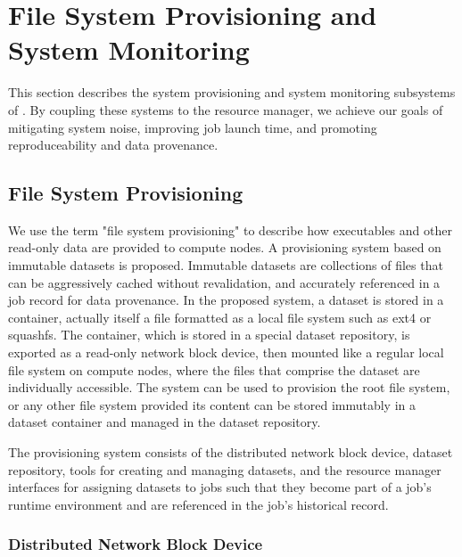 \section{File System Provisioning and System Monitoring}

This section describes the system provisioning and system monitoring
subsystems of \ngrm.  By coupling these systems to the resource manager,
we achieve our goals of mitigating system noise, improving job launch time,
and promoting reproduceability and data provenance.

\subsection{File System Provisioning}

We use the term "file system provisioning" to describe how executables
and other read-only data are provided to compute nodes.
A provisioning system based on immutable datasets is proposed.
Immutable datasets are collections of files that can be aggressively cached
without revalidation,
and accurately referenced in a job record for data provenance.
In the proposed system, a dataset is stored in a container,
actually itself a file formatted as a local file system such as ext4 or
squashfs.  The container, which is stored in a special dataset repository,
is exported as a read-only network block device,
then mounted like a regular local file system on compute nodes,
where the files that comprise the dataset are individually accessible.
The system can be used to provision the root file system,
or any other file system provided its content can be stored immutably
in a dataset container and managed in the dataset repository.

The provisioning system consists of the
distributed network block device,
dataset repository,
tools for creating and managing datasets,
and the resource manager interfaces for assigning datasets to jobs
such that they become part of a job's runtime environment and
are referenced in the job's historical record.


\subsubsection{Distributed Network Block Device}

